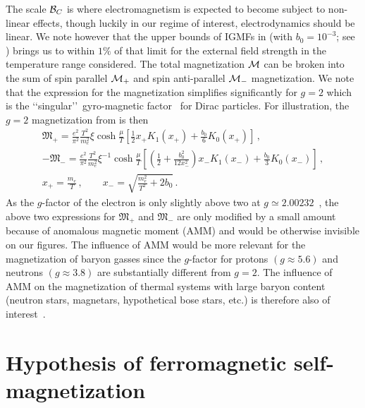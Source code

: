 The scale ${\cal B}_{C}$ is where electromagnetism is expected to become subject to non-linear effects, though luckily in our regime of interest, electrodynamics should be linear. We note however that the upper bounds of IGMFs in  (with $b_{0}=10^{-3}$; see ) brings us to within $1\%$ of that limit for the external field strength in the temperature range considered. The total magnetization ${\cal M}$ can be broken into the sum of spin parallel ${\cal M}_{+}$ and spin anti-parallel ${\cal M}_{-}$ magnetization. We note that the expression for the magnetization simplifies significantly for $g=2$ which is the \lq\lq singular\rq\rq\ gyro-magnetic factor~\cite{Evans:2022fsu,Rafelski:2022bsv} for Dirac particles. For illustration, the $g=2$ magnetization from  is then
\begin{gather}
 \label{g2magplus}
 {\mathfrak M}_{+}=\frac{e^{2}}{\pi^{2}}\frac{T^{2}}{m_{e}^{2}}\xi\cosh{\frac{\mu}{T}}\left[\frac{1}{2}x_{+}K_{1}(x_{+})+\frac{b_{0}}{6}K_{0}(x_{+})\right]\,,\\
 \label{g2magminus}
 -{\mathfrak M}_{-}=\frac{e^{2}}{\pi^{2}}\frac{T^{2}}{m_{e}^{2}}\xi^{-1}\cosh{\frac{\mu}{T}}\left[\left(\frac{1}{2}+\frac{b_{0}^{2}}{12x_{-}^{2}}\right)x_{-}K_{1}(x_{-})+\frac{b_{0}}{3}K_{0}(x_{-})\right]\,,\\
 x_{+}=\frac{m_{e}}{T}\,,\qquad
 x_{-}=\sqrt{\frac{m_{e}^{2}}{T^{2}}+2b_{0}}\,.
\end{gather}
As the $g$-factor of the electron is only slightly above two at $g\simeq2.00232$~\cite{Tiesinga:2021myr}, the above two expressions for ${\mathfrak M}_{+}$ and ${\mathfrak M}_{-}$ are only modified by a small amount because of anomalous magnetic moment (AMM) and would be otherwise invisible on our figures. The influence of AMM would be more relevant for the magnetization of baryon gasses since the $g$-factor for protons $(g\approx5.6)$ and neutrons $(g\approx3.8)$ are substantially different from $g=2$. The influence of AMM on the magnetization of thermal systems with large baryon content (neutron stars, magnetars, hypothetical bose stars, etc.) is therefore also of interest~\cite{Ferrer:2019xlr,Ferrer:2023pgq}.


\section{Hypothesis of ferromagnetic self-magnetization}
\label{sec:self}




